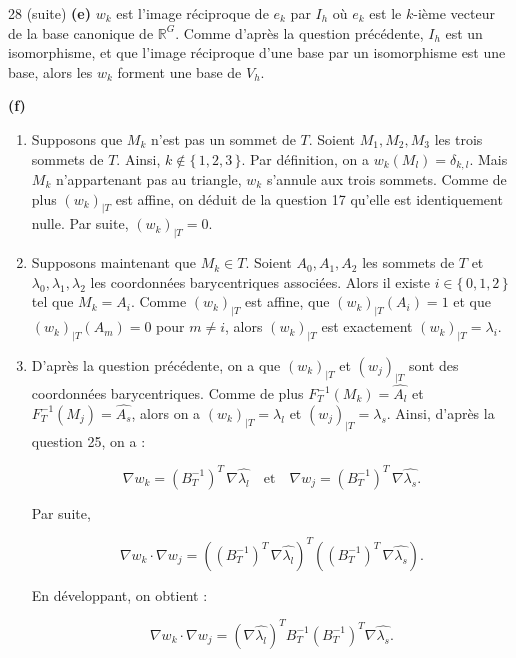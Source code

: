 \begin{reponse}{28 (suite)}
    \vspace{0.8em}
    \textbf{(e)} $w_k$ est l'image réciproque de $e_k$ par $I_h$ où $e_k$ est le $k$-ième vecteur de la base canonique de $\mathbb{R}^G$. Comme d'après la question précédente, $I_h$ est un isomorphisme, et que l'image réciproque d'une base par un isomorphisme est une base, alors les $w_k$ forment une base de $V_h$.

    \vspace{0.8em}
    \textbf{(f)} \begin{enumerate}
        \item Supposons que $M_k$ n'est pas un sommet de $T$. Soient $M_1, M_2, M_3$ les trois sommets de $T$. Ainsi, $k \notin \{\, 1,2,3\, \}$. Par définition, on a $w_k(M_l) = \delta_{k,l}$. Mais $M_k$ n'appartenant pas au triangle, $w_k$ s'annule aux trois sommets. Comme de plus $(w_k)_{\vert T}$ est affine, on déduit de la question 17 qu'elle est identiquement nulle. Par suite, $(w_k)_{\vert T} = 0$.
        \item Supposons maintenant que $M_k \in T$. Soient $A_0, A_1, A_2$ les sommets de $T$ et $\lambda_0, \lambda_1, \lambda_2$ les coordonnées barycentriques associées. Alors il existe $i \in \{\,0,1,2\,\}$ tel que $M_k=A_i$. Comme $(w_k)_{\vert T}$ est affine, que $(w_k)_{\vert T}(A_i) = 1$ et que $(w_k)_{\vert T}(A_m) = 0$ pour $m \neq i$, alors $(w_k)_{\vert T}$ est exactement $(w_k)_{\vert T} = \lambda_i$.
        \item D'après la question précédente, on a que $(w_k)_{\vert T}$ et $(w_j)_{\vert T}$ sont des coordonnées barycentriques. Comme de plus $F_T^{-1}(M_k)=\hat{A_l}$ et $F_T^{-1}(M_j)=\hat{A_s}$, alors on a $(w_k)_{\vert T} = \lambda_l $ et $(w_j)_{\vert T} =\lambda_s$. Ainsi, d'après la question 25, on a :

        \[
            \nabla w_k = (B_T^{-1})^T \, \nabla \hat{\lambda_l} \quad \text{et} \quad \nabla w_j = (B_T^{-1})^T \, \nabla \hat{\lambda_s}.
        \]

        Par suite,

        \[
            \nabla w_k \cdot \nabla w_j = \left((B_T^{-1})^T \, \nabla \hat{\lambda_l} \right)^T \left( (B_T^{-1})^T \, \nabla \hat{\lambda_s} \right).
        \]

        En développant, on obtient :

        \[
            \nabla w_k \cdot \nabla w_j = \left(\nabla \hat{\lambda_l} \right)^TB_T^{-1}(B_T^{-1})^T\nabla \hat{\lambda_s}.
        \]


\end{enumerate}
\end{reponse}
